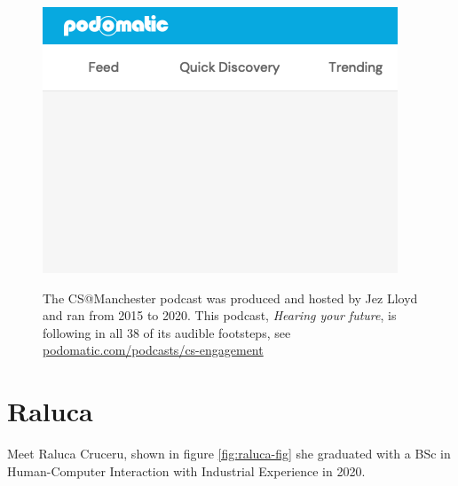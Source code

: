 \documentclass[
]{book}
\begin{document}
\begin{figure}
\href{https://www.podomatic.com/podcasts/cs-engagement}{\includegraphics[width=1\linewidth]{cdyf_files/figure-latex/jez-fig-1} }\caption{The CS@Manchester podcast was produced and hosted by Jez Lloyd and ran from 2015 to 2020. This podcast, \emph{Hearing your future}, is following in all 38 of its audible footsteps, see \href{https://www.podomatic.com/podcasts/cs-engagement}{podomatic.com/podcasts/cs-engagement}}\label{fig:jez-fig}
\end{figure}



\hypertarget{raluca}{%
\chapter{Raluca}\label{raluca}}

Meet Raluca Cruceru, shown in figure \ref{fig:raluca-fig} she graduated with a BSc in Human-Computer Interaction with Industrial Experience in 2020.
\end{document}
